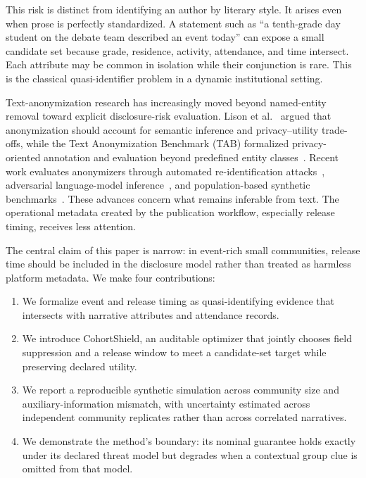 \documentclass[pdflatex,sn-mathphys-num]{sn-jnl}
\theoremstyle{plain}
\begin{document}
This risk is distinct from identifying an author by literary style. It arises even when prose is perfectly standardized. A statement such as ``a tenth-grade day student on the debate team described an event today'' can expose a small candidate set because grade, residence, activity, attendance, and time intersect. Each attribute may be common in isolation while their conjunction is rare. This is the classical quasi-identifier problem in a dynamic institutional setting.

Text-anonymization research has increasingly moved beyond named-entity removal toward explicit disclosure-risk evaluation. Lison et al.~\cite{lison2021} argued that anonymization should account for semantic inference and privacy--utility trade-offs, while the Text Anonymization Benchmark (TAB) formalized privacy-oriented annotation and evaluation beyond predefined entity classes~\cite{pilan2022}. Recent work evaluates anonymizers through automated re-identification attacks~\cite{manzanares2024}, adversarial language-model inference~\cite{staab2025}, and population-based synthetic benchmarks~\cite{krco2026}. These advances concern what remains inferable from text. The operational metadata created by the publication workflow, especially release timing, receives less attention.

The central claim of this paper is narrow: in event-rich small communities, release time should be included in the disclosure model rather than treated as harmless platform metadata. We make four contributions:

\begin{enumerate}
\item We formalize event and release timing as quasi-identifying evidence that intersects with narrative attributes and attendance records.
\item We introduce CohortShield, an auditable optimizer that jointly chooses field suppression and a release window to meet a candidate-set target while preserving declared utility.
\item We report a reproducible synthetic simulation across community size and auxiliary-information mismatch, with uncertainty estimated across independent community replicates rather than across correlated narratives.
\item We demonstrate the method's boundary: its nominal guarantee holds exactly under its declared threat model but degrades when a contextual group clue is omitted from that model.
\end{enumerate}
\end{document}
